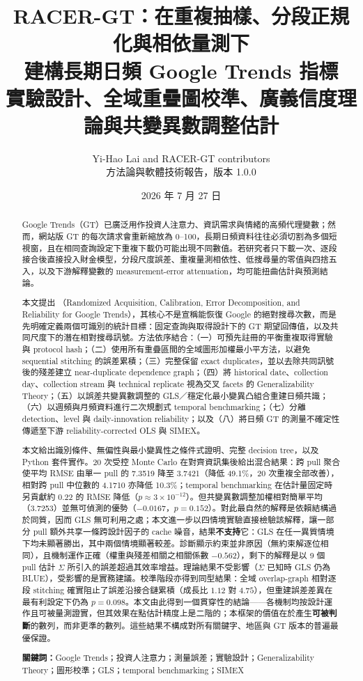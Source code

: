 \documentclass[12pt,a4paper,oneside]{article}
\title{\bfseries
RACER-GT：在重複抽樣、分段正規化與相依量測下\\
建構長期日頻 Google Trends 指標\\[0.5em]
\large 實驗設計、全域重疊圖校準、廣義信度理論與共變異數調整估計
}
\author{Yi-Hao Lai and RACER-GT contributors\\
\small 方法論與軟體技術報告，版本 1.0.0}
\date{2026 年 7 月 27 日}
\begin{document}
\maketitle

\begin{abstract}
Google Trends（GT）已廣泛用作投資人注意力、資訊需求與情緒的高頻代理變數；然而，網站版 GT 的每次請求會重新縮放為 0--100，長期日頻資料往往必須切割為多個短視窗，且在相同查詢設定下重複下載仍可能出現不同數值。若研究者只下載一次、逐段接合後直接投入財金模型，分段尺度誤差、重複量測相依性、低搜尋量的零值與四捨五入，以及下游解釋變數的 measurement-error attenuation，均可能扭曲估計與預測結論。

本文提出 \RACER（Randomized Acquisition, Calibration, Error Decomposition, and Reliability for Google Trends），其核心不是宣稱能恢復 Google 的絕對搜尋次數，而是先明確定義兩個可識別的統計目標：固定查詢與取得設計下的 GT 期望回傳值，以及共同尺度下的潛在相對搜尋訊號。方法依序結合：（一）可預先註冊的平衡重複取得實驗與 protocol hash；（二）使用所有重疊區間的全域圖形加權最小平方法，以避免 sequential stitching 的誤差累積；（三）完整保留 exact duplicates，並以去除共同訊號後的殘差建立 near-duplicate dependence graph；（四）將 historical date、collection day、collection stream 與 technical replicate 視為交叉 facets 的 Generalizability Theory；（五）以誤差共變異數調整的 GLS／穩定化最小變異凸組合重建日頻共識；（六）以週頻與月頻資料進行二次規劃式 temporal benchmarking；（七）分離 detection、level 與 daily-innovation reliability；以及（八）將日頻 GT 的測量不確定性傳遞至下游 reliability-corrected OLS 與 SIMEX。

本文給出識別條件、無偏性與最小變異性之條件式證明、完整 decision tree，以及 Python 套件實作。20 次受控 Monte Carlo 在對齊資訊集後給出混合結果：跨 pull 聚合使平均 RMSE 由單一 pull 的 7.3519 降至 3.7421（降低 49.1\%，20 次重複全部改善），相對跨 pull 中位數的 4.1710 亦降低 10.3\%；temporal benchmarking 在估計量固定時另貢獻約 0.22 的 RMSE 降低（$p\approx3\times10^{-12}$）。但共變異數調整加權相對簡單平均（3.7253）並無可偵測的優勢（$-0.0167$，$p=0.152$）。對此最自然的解釋是依賴結構過於同質，因而 GLS 無可利用之處；本文進一步以四情境實驗直接檢驗該解釋，讓一部分 pull 額外共享一條跨設計因子的 cache 噪音，結果\textbf{不支持}它：GLS 在任一異質情境下均未顯著勝出，其中兩個情境顯著較差。診斷顯示約束並非原因（無約束解逐位相同），且機制運作正確（權重與殘差相關之相關係數 $-0.562$），剩下的解釋是以 9 個 pull 估計 $\Sigma$ 所引入的誤差超過其效率增益。理論結果不受影響（$\Sigma$ 已知時 GLS 仍為 BLUE），受影響的是實務建議。校準階段亦得到同型結果：全域 overlap-graph 相對逐段 stitching 確實阻止了誤差沿接合鏈累積（成長比 $1.12$ 對 $4.75$），但重建誤差差異在最有利設定下仍為 $p=0.098$。本文由此得到一個貫穿性的結論——各機制均按設計運作且可被量測證實，但其效果在點估計精度上是二階的；本框架的價值在於產生\textbf{可被判斷}的數列，而非更準的數列。這些結果不構成對所有關鍵字、地區與 GT 版本的普遍最優保證。

\noindent\textbf{關鍵詞：}Google Trends；投資人注意力；測量誤差；實驗設計；Generalizability Theory；圖形校準；GLS；temporal benchmarking；SIMEX
\end{abstract}
\end{document}
